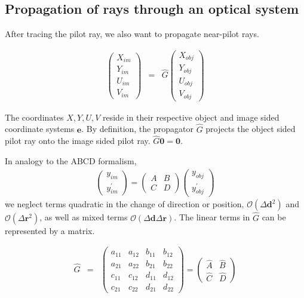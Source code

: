 \documentclass[12pt,a4paper,twoside,openright,BCOR10mm,headsepline,titlepage,abstracton,chapterprefix,final]{scrreprt}
\newcommand\Vector[1]{{\mathbf{#1}}}
\newcommand{\orderof}[1]{\mathcal{O}(#1)}
\begin{document}
\subsection{Propagation of rays through an optical system}

After tracing the pilot ray, we also want to propagate near-pilot rays.

\begin{eqnarray}
 \begin{pmatrix}
  X_{im} \\ Y_{im} \\ U_{im} \\ V_{im}
 \end{pmatrix}
 &=&
 \hat{G}
 \begin{pmatrix}
  X_{obj} \\ Y_{obj} \\ U_{obj} \\ V_{obj}
 \end{pmatrix}
\end{eqnarray}

The coordinates $X,Y,U,V$ reside in their respective object and image sided coordinate systems $\Vector{e}$.
By definition, the propagator $\hat{G}$ projects the object sided pilot ray onto the image sided pilot ray.
$\hat{G}\Vector{0} = \Vector{0}$.

In analogy to the ABCD formalism, 
\begin{eqnarray}
 \begin{pmatrix}
  y_{im} \\ y^\prime_{im}
 \end{pmatrix}
 =
 \begin{pmatrix}
   A & B \\ C & D
 \end{pmatrix}
 \begin{pmatrix}
   y_{obj} \\ y^\prime_{obj}
 \end{pmatrix}
\end{eqnarray}
we neglect terms quadratic in the change of direction or position, 
$\orderof{\Delta\Vector{d}^2}$ and $\orderof{\Delta\Vector{r}^2}$, as well as mixed terms $\orderof{\Delta\Vector{d}\Delta\Vector{r}}$.
The linear terms in $\hat{G}$ can be represented by a matrix.

\begin{eqnarray}
 \hat{G} &=&
 \begin{pmatrix}
  a_{11} & a_{12} & b_{11} & b_{12} \\
  a_{21} & a_{22} & b_{21} & b_{22} \\  
  c_{11} & c_{12} & d_{11} & d_{12} \\
  c_{21} & c_{22} & d_{21} & d_{22} 
 \end{pmatrix}
 =
 \begin{pmatrix}
  \hat{A} & \hat{B} \\
  \hat{C} & \hat{D}
 \end{pmatrix} 
\end{eqnarray}
\end{document}
